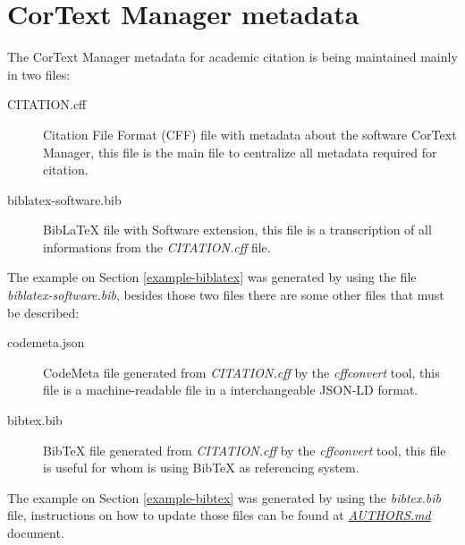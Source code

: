 \documentclass{article}
\begin{document}
\section{CorText Manager metadata}

The CorText Manager metadata for academic citation is being maintained mainly in two files:

\begin{description}
  \item[CITATION.cff] Citation File Format (CFF) file with metadata about the software CorText Manager,
    this file is the main file to centralize all metadata required for citation.
  \item[biblatex-software.bib] BibLaTeX file with Software extension,
    this file is a transcription of all informations from the {\em CITATION.cff} file.
\end{description}

The example on Section \ref{example-biblatex} was generated by using the file
{\em biblatex-software.bib}, besides those two files there are some other
files that must be described:

\begin{description}
  \item[codemeta.json] CodeMeta file generated from {\em CITATION.cff} by the
    {\em cffconvert} tool, this file is a machine-readable file in a
    interchangeable JSON-LD format.
  \item[bibtex.bib] BibTeX file generated from {\em CITATION.cff} by the {\em
    cffconvert} tool, this file is useful for whom is using BibTeX as referencing
    system.
\end{description}

The example on Section \ref{example-bibtex} was generated by using the {\em
bibtex.bib} file, instructions on how to update those files can be found at
\href{https://github.com/cortext/how-to-cite-cortext/blob/main/AUTHORS.md}{\em AUTHORS.md}
document.

\printbibliography
\end{document}
